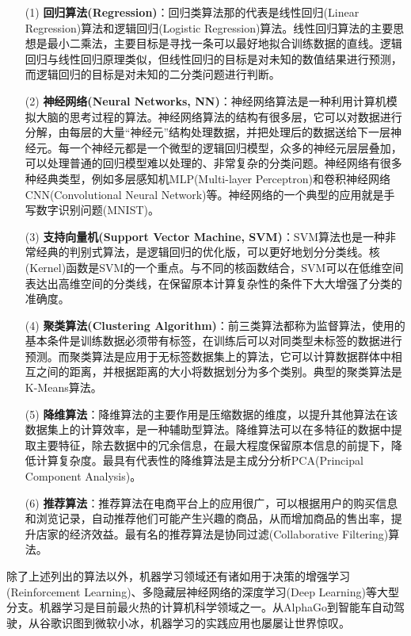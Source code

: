 \begin{enumerate}
	\item [(1)] \textbf{回归算法(Regression)}：回归类算法那的代表是线性回归(Linear Regression)算法和逻辑回归(Logistic Regression)算法。线性回归算法的主要思想是最小二乘法，主要目标是寻找一条可以最好地拟合训练数据的直线。逻辑回归与线性回归原理类似，但线性回归的目标是对未知的数值结果进行预测，而逻辑回归的目标是对未知的二分类问题进行判断。
	\item [(2)] \textbf{神经网络(Neural Networks, NN)}：神经网络算法是一种利用计算机模拟大脑的思考过程的算法。神经网络算法的结构有很多层，它可以对数据进行分解，由每层的大量“神经元”结构处理数据，并把处理后的数据送给下一层神经元。每一个神经元都是一个微型的逻辑回归模型，众多的神经元层层叠加，可以处理普通的回归模型难以处理的、非常复杂的分类问题。神经网络有很多种经典类型，例如多层感知机MLP(Multi-layer Perceptron)和卷积神经网络CNN(Convolutional Neural Network)等。神经网络的一个典型的应用就是手写数字识别问题(MNIST)。
	\item [(3)] \textbf{支持向量机(Support Vector Machine, SVM)}：SVM算法也是一种非常经典的判别式算法，是逻辑回归的优化版，可以更好地划分分类线。核(Kernel)函数是SVM的一个重点。与不同的核函数结合，SVM可以在低维空间表达出高维空间的分类线，在保留原本计算复杂性的条件下大大增强了分类的准确度。
	\item [(4)] \textbf{聚类算法(Clustering Algorithm)}：前三类算法都称为监督算法，使用的基本条件是训练数据必须带有标签，在训练后可以对同类型未标签的数据进行预测。而聚类算法是应用于无标签数据集上的算法，它可以计算数据群体中相互之间的距离，并根据距离的大小将数据划分为多个类别。典型的聚类算法是K-Means算法。
	\item[(5)] \textbf{降维算法}：降维算法的主要作用是压缩数据的维度，以提升其他算法在该数据集上的计算效率，是一种辅助型算法。降维算法可以在多特征的数据中提取主要特征，除去数据中的冗余信息，在最大程度保留原本信息的前提下，降低计算复杂度。最具有代表性的降维算法是主成分分析PCA(Principal Component Analysis)。
	\item[(6)] \textbf{推荐算法}：推荐算法在电商平台上的应用很广，可以根据用户的购买信息和浏览记录，自动推荐他们可能产生兴趣的商品，从而增加商品的售出率，提升店家的经济效益。最有名的推荐算法是协同过滤(Collaborative Filtering)算法。
\end{enumerate}

除了上述列出的算法以外，机器学习领域还有诸如用于决策的增强学习(Reinforcement Learning)、多隐藏层神经网络的深度学习(Deep Learning)等大型分支。机器学习是目前最火热的计算机科学领域之一。从AlphaGo到智能车自动驾驶，从谷歌识图到微软小冰，机器学习的实践应用也屡屡让世界惊叹。



